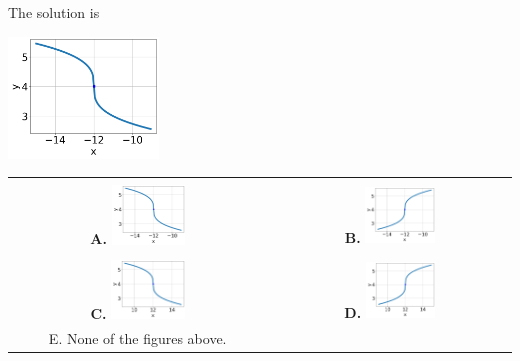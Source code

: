 \documentclass{extbook}[14pt]
\begin{document}
 
 The solution is  
 \begin{center} \includegraphics[width=0.3\textwidth]{../Figures/radicalEquationToGraphDB.png} \end{center}\begin{tabular}{|c|c|} 
\hline 
 & \tabularnewline 
 \textbf{A.} \includegraphics[width=0.3\textwidth]{../Figures/radicalEquationToGraphDB.png} & \textbf{B.} \includegraphics[width=0.3\textwidth]{../Figures/radicalEquationToGraphBB.png} \tabularnewline 
\hline 
 & \tabularnewline 
 \textbf{C.} \includegraphics[width=0.3\textwidth]{../Figures/radicalEquationToGraphAB.png} & \textbf{D.} \includegraphics[width=0.3\textwidth]{../Figures/radicalEquationToGraphCB.png} \tabularnewline 
\hline 
 E. None of the figures above. & \tabularnewline 
\hline 
 \end{tabular} 
 
\end{document}
